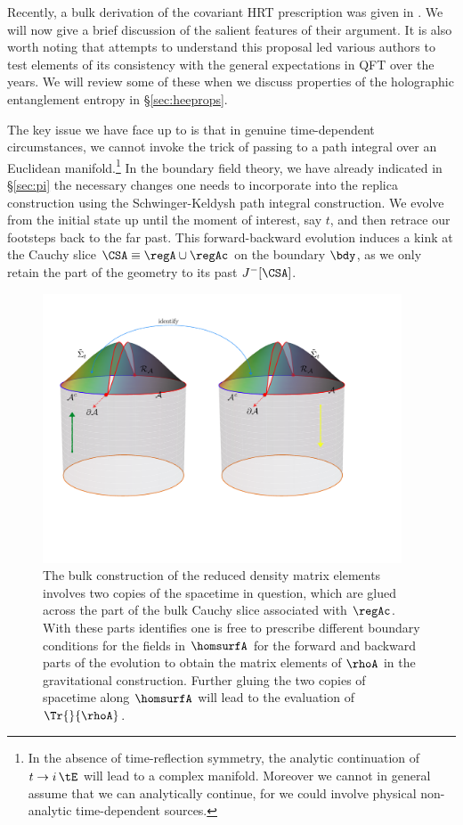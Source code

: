 \documentclass[12pt,openany]{book}
\begin{document}
Recently, a bulk derivation of the covariant HRT prescription was given in \cite{Dong:2016hjy}. We will now give a brief discussion of the salient features of their argument. It is also worth noting that attempts to understand this proposal led various authors to test elements of its consistency  with the general expectations in QFT over the years. We will review some of these when we discuss properties of the holographic entanglement entropy in \S\ref{sec:heeprops}.

The key issue we have face up to is that in genuine time-dependent circumstances, we cannot invoke the trick of passing to a path integral over an Euclidean manifold.\footnote{ In the absence of time-reflection symmetry, the analytic continuation of $t \to i\,\tE$ will lead to a complex manifold. Moreover we cannot in general assume that we can analytically continue, for we could involve physical non-analytic time-dependent sources.}
In the boundary field theory, we have already indicated in \S\ref{sec:pi} the necessary changes one needs to incorporate into the replica construction using the Schwinger-Keldysh  path integral construction. We evolve  from the initial state up until the moment of interest, say $t$, and then retrace our footsteps back to the far past. This forward-backward evolution induces a kink at the Cauchy slice $\CSA\equiv \regA \cup \regAc$  on the boundary $\bdy$, as we only retain the part of the geometry to its past $J^-[\CSA]$.


\begin{figure}[tp!]
\begin{center}
\includegraphics[width=4.2in]{figures/rhoAbulk}
\caption{The bulk construction of the reduced density matrix elements involves two copies of the spacetime in question, which are glued across the part of the bulk Cauchy slice associated with $\regAc$. With these parts identifies one is free to prescribe different boundary conditions for the fields in $\homsurfA$ for the forward and backward parts of the evolution to obtain the matrix elements of $\rhoA$ in the gravitational construction. Further gluing the two copies of spacetime along $\homsurfA$ will lead to the evaluation of $\Tr{}{\rhoA}$.
}
\label{f:bulksk}
\end{center}
\end{figure}
%
\end{document}
